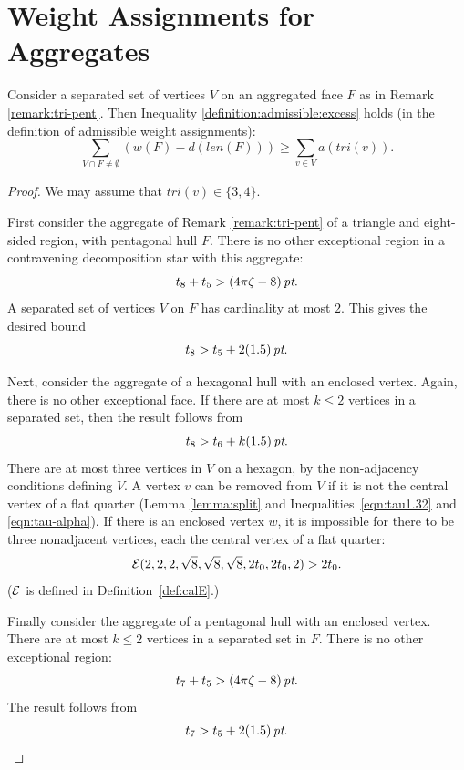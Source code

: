 
\section{Weight Assignments for Aggregates}

\begin{lemma}
Consider a separated set of vertices $V$ on an aggregated face $F$
as in Remark \ref{remark:tri-pent}.  Then Inequality
\ref{definition:admissible:excess} holds (in the definition of
admissible weight assignments):
    $$\sum_{V\cap F\ne\emptyset} (w(F) -d(len(F)))
            \ge \sum_{v\in V} a(tri(v)).$$
\end{lemma}

\begin{proof}
We may assume that $tri(v)\in\{3,4\}$.

First consider the aggregate of Remark \ref{remark:tri-pent} of a
triangle and eight-sided region, with pentagonal hull $F$. There
is no other exceptional region in a contravening decomposition
star with this aggregate:
    $$t_8 + t_5 > (4\pi\zeta-8)\,\hbox{\it pt}.$$
A separated set of vertices $V$ on $F$ has cardinality at most
$2$.  This gives the desired bound $$t_8 > t_5 + 2 (1.5)\,\hbox{\it pt}.$$

Next, consider the aggregate of a hexagonal hull with an enclosed
vertex.  Again, there is no other exceptional face. If there are
at most $k\le 2$ vertices in a separated set, then the result
follows from
    $$t_8 > t_6 + k (1.5)\,\hbox{\it pt}.$$
There are at most three vertices in $V$ on a hexagon, by the
non-adjacency conditions defining $V$. A vertex $v$ can be removed
from $V$ if it is not the central vertex of a flat quarter (Lemma
\ref{lemma:split} and Inequalities~\ref{eqn:tau1.32} and
\ref{eqn:tau-alpha}). If there is an enclosed vertex $w$, it is
impossible for there to be three nonadjacent vertices, each the
central vertex of a flat quarter:
    $${\mathcal E}(2,2,2,\sqrt8,\sqrt8,\sqrt8,2t_0,2t_0,2)>2t_0.$$
(${\mathcal E}$ is defined in Definition~\ref{def:calE}.)

Finally consider the aggregate of a pentagonal hull with an
enclosed vertex.  There are at most $k\le2$ vertices in a
separated set in $F$.  There is no other exceptional region:
    $$t_7 + t_5 > (4\pi\zeta-8)\,\hbox{\it pt}.$$
The result follows from
    $$t_7 > t_5 + 2(1.5)\,\hbox{\it pt}.$$
\end{proof}

